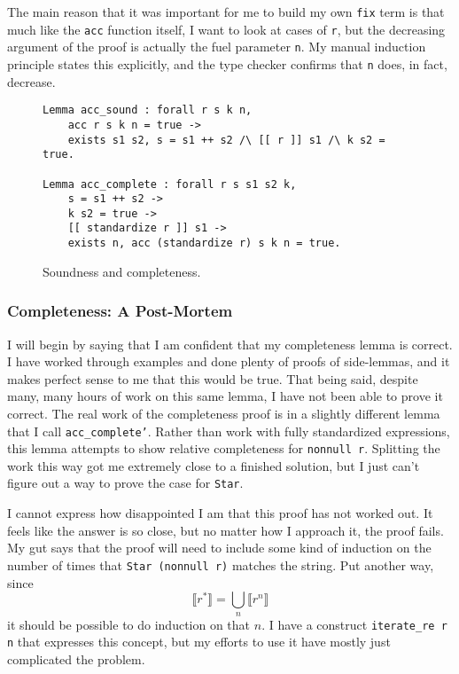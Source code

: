 \documentclass{article}
\newcommand{\coq}[1]{\texttt{#1}}
\begin{document}
The main reason that it was important for me to build my own \coq{fix} term is
that much like the \coq{acc} function itself, I want to look at cases of
\coq{r}, but the decreasing argument of the proof is actually the fuel parameter
\coq{n}. My manual induction principle states this explicitly, and the type
checker confirms that \coq{n} does, in fact, decrease.

\begin{figure}
  \centering
\begin{verbatim}
Lemma acc_sound : forall r s k n,
    acc r s k n = true ->
    exists s1 s2, s = s1 ++ s2 /\ [[ r ]] s1 /\ k s2 = true.

Lemma acc_complete : forall r s s1 s2 k,
    s = s1 ++ s2 ->
    k s2 = true ->
    [[ standardize r ]] s1 ->
    exists n, acc (standardize r) s k n = true.
\end{verbatim}
  \caption{Soundness and completeness.}
  \label{fig:sandc}
\end{figure}

\subsubsection{Completeness: A Post-Mortem}
I will begin by saying that I am confident that my completeness lemma is
correct. I have worked through examples and done plenty of proofs of
side-lemmas, and it makes perfect sense to me that this would be true. That
being said, despite many, many hours of work on this same lemma, I have not been
able to prove it correct. The real work of the completeness proof is in a
slightly different lemma that I call \coq{acc_complete'}. Rather than work with
fully standardized expressions, this lemma attempts to show relative
completeness for \coq{nonnull r}. Splitting the work this way got me extremely
close to a finished solution, but I just can't figure out a way to prove the
case for \coq{Star}.

I cannot express how disappointed I am that this proof has not worked out. It
feels like the answer is so close, but no matter how I approach it, the proof
fails. My gut says that the proof will need to include some kind of induction on
the number of times that \coq{Star (nonnull r)} matches the string. Put another
way, since
$$ \llbracket r^* \rrbracket = \bigcup_n \llbracket r^n \rrbracket $$
it should be possible to do induction on that $n$. I have a construct
\coq{iterate_re r n} that expresses this concept, but my efforts to use it have
mostly just complicated the problem.
\end{document}

